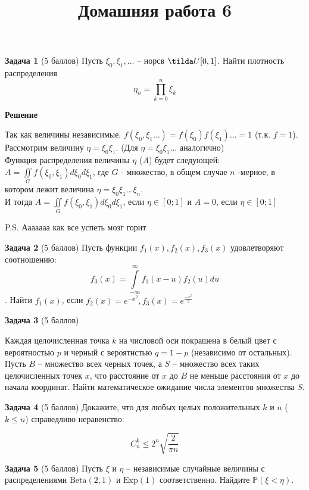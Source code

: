 \documentclass{article}
\title{Домашняя работа 6}
\newcommand\Exp{\text{Exp}}
\newcommand\Beta{\text{Beta}}
\newcommand\myp{\mathbb P}
\begin{document}
\maketitle
\textbf{Задача 1} (5 баллов)
Пусть $\xi_0, \xi_1, \dots$ -- норсв $\tilda U[0, 1]$. Найти плотность распределения
$$\eta_n = \prod\limits_{k=0}^{n}\xi_k$$

\textbf{Решение}

Так как величины независимые, $f(\xi_0, \xi_1 \dots) = f(\xi_0) f(\xi_1) \dots = 1$ (т.к. $f = 1$). \\
Рассмотрим величину $\eta = \xi_0 \xi_1$. (Для $\eta = \xi_0 \xi_1 \dots$ аналогично) \\
Функция распределения величины $\eta$ ($A$) будет следующей: $A = \iint\limits_{G} f(\xi_0, \xi_1) d\xi_0 d\xi_1$, где $G$ - множество, в общем случае $n$ -мерное, в котором лежит величина $\eta = \xi_0 \xi_1 \dots \xi_n$. \\
И тогда $A = \iint\limits_{G} f(\xi_0, \xi_1) d\xi_0 d\xi_1$, если $\eta \in [0; 1]$ и $A = 0$, если $\eta \in [0; 1]$

P.S. Ааааааа как все успеть мозг горит



\textbf{Задача 2} (5 баллов)
Пусть функции $f_1(x), f_2(x), f_3(x)$ удовлетворяют соотношению:
$$f_3(x) = \int\limits_{-\infty}^{\infty} f_1(x - u)f_2(u)du$$. Найти $f_1(x)$, если $f_2(x) = e^{-x^2}, f_3(x) = e^{\frac{-x^2}{2}}$


\textbf{Задача 3} (5 баллов)

Каждая целочисленная точка $k$ на числовой оси покрашена в белый цвет с 
вероятностью $p$ и черный с вероятнстью $q = 1 - p$ (независимо от остальных).
Пусть $B$ -- множество всех черных точек, а $S$ -- множество всех таких 
целочисленных точек $x$, что расстояние от $x$ до $B$ не меньше расстояния от 
$x$ до начала координат.
Найти математическое ожидание числа элементов множества $S$.


\textbf{Задача 4} (5 баллов)
Докажите, что для любых целых положительных $k$ и $n$ ($k \leq n$) справедливо неравенство:

$$C_n^k \leq 2^n\sqrt{\frac{2}{\pi n}}$$

\textbf{Задача 5} (5 баллов)
Пусть $\xi$ и $\eta$ -- независимые случайные величины с распределениями 
$\Beta(2, 1)$ и $\Exp(1)$ соответственно.
Найдите $\myp \left( \xi < \eta \right)$.
\end{document}
